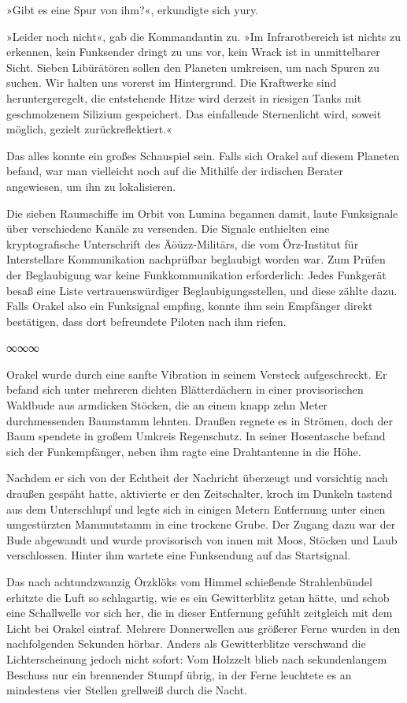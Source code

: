 »Gibt es eine Spur von ihm?«, erkundigte sich yury.

»Leider noch nicht«, gab die Kommandantin zu. »Im Infrarotbereich ist nichts zu erkennen, kein Funksender dringt zu uns vor, kein Wrack ist in unmittelbarer Sicht. Sieben Libürätören sollen den Planeten umkreisen, um nach Spuren zu suchen. Wir halten uns vorerst im Hintergrund. Die Kraftwerke sind heruntergeregelt, die entstehende Hitze wird derzeit in riesigen Tanks mit geschmolzenem Silizium gespeichert. Das einfallende Sternenlicht wird, soweit möglich, gezielt zurückreflektiert.«

Das alles konnte ein großes Schauspiel sein. Falls sich Orakel auf diesem Planeten befand, war man vielleicht noch auf die Mithilfe der irdischen Berater angewiesen, um ihn zu lokalisieren.

Die sieben Raumschiffe im Orbit von Lumina begannen damit, laute Funksignale über verschiedene Kanäle zu versenden. Die Signale enthielten eine kryptografische Unterschrift des Äöüzz-Militärs, die vom Örz-Institut für Interstellare Kommunikation nachprüfbar beglaubigt worden war. Zum Prüfen der Beglaubigung war keine Funkkommunikation erforderlich: Jedes Funkgerät besaß eine Liste vertrauenswürdiger Beglaubigungsstellen, und diese zählte dazu. Falls Orakel also ein Funksignal empfing, konnte ihm sein Empfänger direkt bestätigen, dass dort befreundete Piloten nach ihm riefen.

\begin{center}
∞∞∞
\end{center}

Orakel wurde durch eine sanfte Vibration in seinem Versteck aufgeschreckt. Er befand sich unter mehreren dichten Blätterdächern in einer provisorischen Waldbude aus armdicken Stöcken, die an einem knapp zehn Meter durchmessenden Baumstamm lehnten. Draußen regnete es in Strömen, doch der Baum spendete in großem Umkreis Regenschutz. In seiner Hosentasche befand sich der Funkempfänger, neben ihm ragte eine Drahtantenne in die Höhe.

Nachdem er sich von der Echtheit der Nachricht überzeugt und vorsichtig nach draußen gespäht hatte, aktivierte er den Zeitschalter, kroch im Dunkeln tastend aus dem Unterschlupf und legte sich in einigen Metern Entfernung unter einen umgestürzten Mammutstamm in eine trockene Grube. Der Zugang dazu war der Bude abgewandt und wurde provisorisch von innen mit Moos, Stöcken und Laub verschlossen. Hinter ihm wartete eine Funksendung auf das Startsignal.

Das nach achtundzwanzig Örzklöks vom Himmel schießende Strahlenbündel erhitzte die Luft so schlagartig, wie es ein Gewitterblitz getan hätte, und schob eine Schallwelle vor sich her, die in dieser Entfernung gefühlt zeitgleich mit dem Licht bei Orakel eintraf. Mehrere Donnerwellen aus größerer Ferne wurden in den nachfolgenden Sekunden hörbar. Anders als Gewitterblitze verschwand die Lichterscheinung jedoch nicht sofort: Vom Holzzelt blieb nach sekundenlangem Beschuss nur ein brennender Stumpf übrig, in der Ferne leuchtete es an mindestens vier Stellen grellweiß durch die Nacht.


